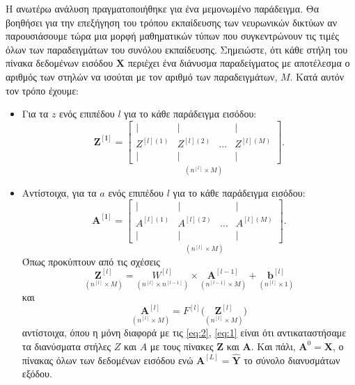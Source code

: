 Η ανωτέρω ανάλυση πραγματοποιήθηκε για ένα μεμονωμένο παράδειγμα. Θα βοηθήσει για την επεξήγηση του τρόπου εκπαίδευσης των νευρωνικών δικτύων αν παρουσιάσουμε τώρα μια μορφή μαθηματικών τύπων που συγκεντρώνουν τις τιμές όλων των παραδειγμάτων του συνόλου εκπαίδευσης. Σημειώστε, ότι κάθε στήλη του πίνακα δεδομένων εισόδου $\boldsymbol{X}$ περιέχει ένα διάνυσμα παραδείγματος με αποτέλεσμα ο αριθμός των στηλών να ισούται με τον αριθμό των παραδειγμάτων, $M$. Κατά αυτόν τον τρόπο έχουμε:
\begin{itemize}
  \item Για τα $z$ ενός επιπέδου $l$ για το κάθε παράδειγμα εισόδου:
  \begin{equation}
    \boldsymbol{Z^{[l]}} =
    \underset{(n^{[l]} \times M)}{\begin{bmatrix}
        |&|&&| \\
        Z^{[l](1)} & Z^{[l](2)} & \dots & Z^{[l](M)}\\
        |&|&&|
    \end{bmatrix}}.
  \end{equation}
  \item Αντίστοιχα, για τα $a$ ενός επιπέδου $l$ για το κάθε παράδειγμα εισόδου:
  \begin{equation}
    \boldsymbol{A^{[l]}} =
    \underset{(n^{[l]} \times M)}{\begin{bmatrix}
        |&|&&| \\
        A^{[l](1)} & A^{[l](2)} & \dots & A^{[l](M)}\\
        |&|&&|
    \end{bmatrix}}.
  \end{equation}
  Όπως προκύπτουν από τις σχέσεις 
  \begin{equation}\label{eq:_fw_z}
    \underset{(n^{[l]} \times M)}{\boldsymbol{Z}^{[l]}} = \underset{(n^{[l]} \times n^{[l-1]})}{W^{[l]}} \times \underset{(n^{[l-1]} \times M)}{\boldsymbol{A}^{[l-1]}} + \underset{(n^{[l]} \times 1)}{\boldsymbol{b}^{[l]}}
  \end{equation}
   και 
  \begin{equation}\label{eq:fw_a}
    \underset{(n^{[l]} \times M)}{\boldsymbol{A}^{[l]}} = F^{[l]}\big(\underset{(n^{[l]} \times M)}{\boldsymbol{Z}^{[l]}}\big)
  \end{equation} 
  αντίστοιχα, όπου η μόνη διαφορά με τις \ref{eq:2}, \ref{eq:1} είναι ότι αντικαταστήσαμε τα διανύσματα στήλες $Z$ και $A$ με τους πίνακες $\boldsymbol{Z}$ και $\boldsymbol{A}$. Και πάλι, $\boldsymbol{A}^{0} = \boldsymbol{X}$, ο πίνακας όλων των δεδομένων εισόδου ενώ $\boldsymbol{A}^{[L]} = \boldsymbol{\hat{Y}}$ το σύνολο διανυσμάτων εξόδου.
\end{itemize}

